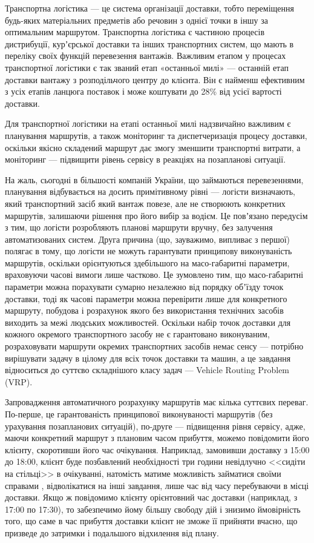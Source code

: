 Транспортна логістика --- це система організації доставки, тобто переміщення будь-яких матеріальних предметів або речовин з однієї точки в іншу за оптимальним маршрутом. Транспортна логістика є частиною процесів дистрибуції, курʼєрської доставки та інших транспортних систем, що мають в переліку своїх функцій перевезення вантажів. Важливим етапом у процесах транспортної логістики є так званий етап «останньої милі» --- останній етап доставки вантажу з розподільчого центру до клієнта. Він є найменш ефективним з усіх етапів ланцюга поставок і може коштувати до 28\% від усієї вартості доставки. \cite{Scott_2009}

Для транспортної логістики на етапі останньої милі надзвичайно важливим є планування маршрутів, а також моніторинг та диспетчеризація процесу доставки, оскільки якісно складений маршрут дає змогу зменшити транспортні витрати, а моніторинг --- підвищити рівень сервісу в реакціях на позапланові ситуації.

На жаль, сьогодні в більшості компаній України, що займаються перевезеннями, планування відбувається на досить примітивному рівні --- логісти визначають, який транспортний засіб який вантаж повезе, але не створюють конкретних маршрутів, залишаючи рішення про його вибір за водієм. Це повʼязано передусім з тим, що логісти розробляють планові маршрути вручну, без залучення автоматизованих систем. Друга причина (що, зауважимо, випливає з першої) полягає в тому, що логісти не можуть гарантувати принципову виконуваність маршрутів, оскільки орієнтуються здебільшого на масо-габаритні параметри, враховуючи часові вимоги лише частково. Це зумовлено тим, що масо-габаритні параметри можна порахувати сумарно незалежно від порядку обʼїзду точок доставки, тоді як часові параметри можна перевірити лише для конкретного маршруту, побудова і розрахунок якого без використання технічних засобів виходить за межі людських можливостей. Оскільки набір точок доставки для кожного окремого транспортного засобу не є гарантовано виконуваним, розраховувати маршрути окремих транспортних засобів немає сенсу --- потрібно вирішувати задачу в цілому для всіх точок доставки та машин, а це завдання відноситься до суттєво складнішого класу задач --- Vehicle Routing Problem (VRP).

Запровадження автоматичного розрахунку маршрутів має кілька суттєвих переваг. По-перше, це гарантованість принципової виконуваності маршрутів (без урахування позапланових ситуацій), по-друге --- підвищення рівня сервісу, адже, маючи конкретний маршрут з плановим часом прибуття, можемо повідомити його клієнту, скоротивши його час очікування. Наприклад, замовивши доставку з 15:00 до 18:00, клієнт буде позбавлений необхідності три години невідлучно <<сидіти на стільці>> в очікуванні, натомість матиме можливість  займатися своїми справами ,   відволікатися на інші завдання, лише час від часу перебуваючи в місці доставки. Якщо ж повідомимо клієнту орієнтовний час доставки (наприклад, з 17:00 по 17:30), то забезпечимо йому більшу свободу дій і знизимо ймовірність того, що саме в час прибуття доставки клієнт не зможе її прийняти вчасно, що призведе до затримки і подальшого відхилення від плану.

